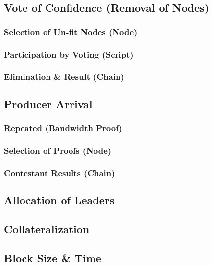\documentclass[a4paper,11pt]{article}
\begin{document}
\subsection{Vote of Confidence (Removal of Nodes)}

\subsubsection{Selection of Un-fit Nodes (Node)}

\subsubsection{Participation by Voting (Script)}

\subsubsection{Elimination \& Result (Chain)}

\subsection{Producer Arrival}

\subsubsection{Repeated (Bandwidth Proof)}

\subsubsection{Selection of Proofs (Node)}

\subsubsection{Contestant Results (Chain)}

\subsection{Allocation of Leaders}


\subsection{Collateralization}

\subsection{Block Size \& Time}
\end{document}
